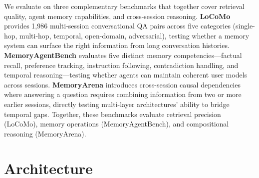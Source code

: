 \documentclass{article}
\begin{document}
We evaluate on three complementary benchmarks that together cover
retrieval quality, agent memory capabilities, and cross-session reasoning.
\textbf{LoCoMo} \citep{maharana2024locomo} provides 1{,}986 multi-session
conversational QA pairs across five categories (single-hop, multi-hop,
temporal, open-domain, adversarial), testing whether a memory system
can surface the right information from long conversation histories.
\textbf{MemoryAgentBench} \citep{he2025memoryagentbench} evaluates five
distinct memory competencies---factual recall, preference tracking,
instruction following, contradiction handling, and temporal reasoning---testing
whether agents can maintain coherent user models across sessions.
\textbf{MemoryArena} \citep{he2026memoryarena} introduces cross-session
causal dependencies where answering a question requires combining
information from two or more earlier sessions, directly testing
multi-layer architectures' ability to bridge temporal gaps.
Together, these benchmarks evaluate retrieval precision (LoCoMo),
memory operations (MemoryAgentBench), and compositional reasoning
(MemoryArena).

\section{Architecture}
\label{sec:architecture}
\end{document}
